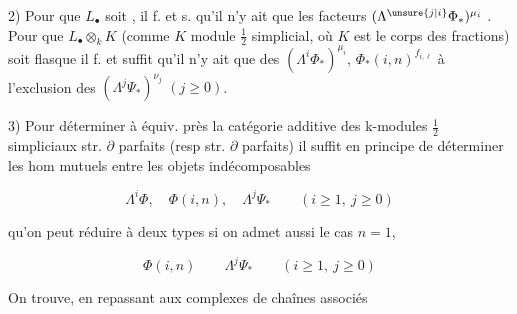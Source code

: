 
2) Pour que $L_{\bullet}$ soit  , il f. et s. qu'il n'y ait que les facteurs $(\Lambda^{\unsure{j|i}}\Phi_{\ast})^{\mu_i}$ . Pour que $L_{\bullet}\otimes_k K$ (comme $K$ module $\frac12$ simplicial, où $K$ est le corps des fractions) soit flasque il f. et suffit qu'il n'y ait que des $(\Lambda^i\Phi_{\ast})^{\mu_i}$, $\Phi_{\ast}(i,n)^{f_{i,\ell}}$  à l'exclusion des $(\Lambda^j\Psi_{\ast})^{\nu_j}$ $(j\geq0)$.

 3) Pour déterminer à équiv. près la catégorie additive des k-modules $\frac12$ simpliciaux str. $\partial$ parfaits (resp str. $\partial$ parfaits) il suffit en principe de déterminer les hom mutuels entre les objets indécomposables

\[
\Lambda^i\Phi,\quad \Phi(i,n),\quad\Lambda^j\Psi_{\ast}\qquad(i\geq1,\ j\geq0)
\]


qu'on peut réduire à deux types si on admet aussi le cas $n=1$,

\[
\Phi(i,n)\qquad\Lambda^j\Psi_{\ast}\qquad(i\geq1,\ j\geq0)
\]

On trouve, en repassant aux complexes de chaînes associés

